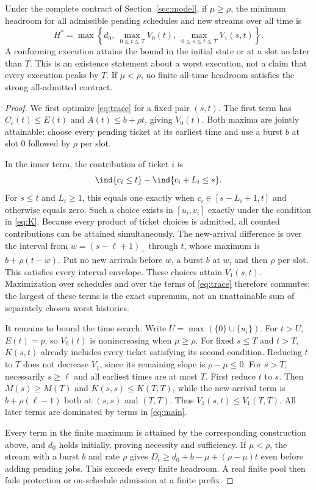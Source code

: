 \begin{theorem}
\label{thm:main}
Under the complete contract of Section~\ref{sec:model}, if $\mu\ge\rho$, the minimum headroom for all admissible pending schedules and new streams over all time is
\begin{equation}
\boxed{
H^*=\max\left\{d_0,\ \max_{0\le t\le T}V_0(t),\
\max_{0\le s\le t\le T}V_1(s,t)\right\}.}
\label{eq:main}
\end{equation}
A conforming execution attains the bound in the initial state or at a slot no later than $T$. This is an existence statement about a worst execution, not a claim that every execution peaks by $T$. If $\mu<\rho$, no finite all-time headroom satisfies the strong all-admitted contract.
\end{theorem}
\begin{proof}
We first optimize \cref{eq:trace} for a fixed pair $(s,t)$. The first term has $C_c(t)\le E(t)$ and $A(t)\le b+\rho t$, giving $V_0(t)$. Both maxima are jointly attainable: choose every pending ticket at its earliest time and use a burst $b$ at slot 0 followed by $\rho$ per slot.

In the inner term, the contribution of ticket $i$ is
\[
\ind\{c_i\le t\}-\ind\{c_i+L_i\le s\}.
\]
For $s\le t$ and $L_i\ge1$, this equals one exactly when $c_i\in[s-L_i+1,t]$ and otherwise equals zero. Such a choice exists in $[u_i,v_i]$ exactly under the condition in \cref{eq:K}. Because every product of ticket choices is admitted, all counted contributions can be attained simultaneously. The new-arrival difference is over the interval from $w=(s-\ell+1)_+$ through $t$, whose maximum is $b+\rho(t-w)$. Put no new arrivals before $w$, a burst $b$ at $w$, and then $\rho$ per slot. This satisfies every interval envelope. These choices attain $V_1(s,t)$. Maximization over schedules and over the terms of \cref{eq:trace} therefore commutes; the largest of these terms is the exact supremum, not an unattainable sum of separately chosen worst histories.

It remains to bound the time search. Write $U=\max(\{0\}\cup\{u_i\})$. For $t>U$, $E(t)=p$, so $V_0(t)$ is nonincreasing when $\mu\ge\rho$. For fixed $s\le T$ and $t>T$, $K(s,t)$ already includes every ticket satisfying its second condition. Reducing $t$ to $T$ does not decrease $V_1$, since its remaining slope is $\rho-\mu\le0$. For $s>T$, necessarily $s\ge\ell$ and all earliest times are at most $T$. First reduce $t$ to $s$. Then $M(s)\ge M(T)$ and $K(s,s)\le K(T,T)$, while the new-arrival term is $b+\rho(\ell-1)$ both at $(s,s)$ and $(T,T)$. Thus $V_1(s,t)\le V_1(T,T)$. All later terms are dominated by terms in \cref{eq:main}.

Every term in the finite maximum is attained by the corresponding construction above, and $d_0$ holds initially, proving necessity and sufficiency. If $\mu<\rho$, the stream with a burst $b$ and rate $\rho$ gives $D_t\ge d_0+b-\mu+(\rho-\mu)t$ even before adding pending jobs. This exceeds every finite headroom. A real finite pool then fails protection or on-schedule admission at a finite prefix.
\end{proof}

